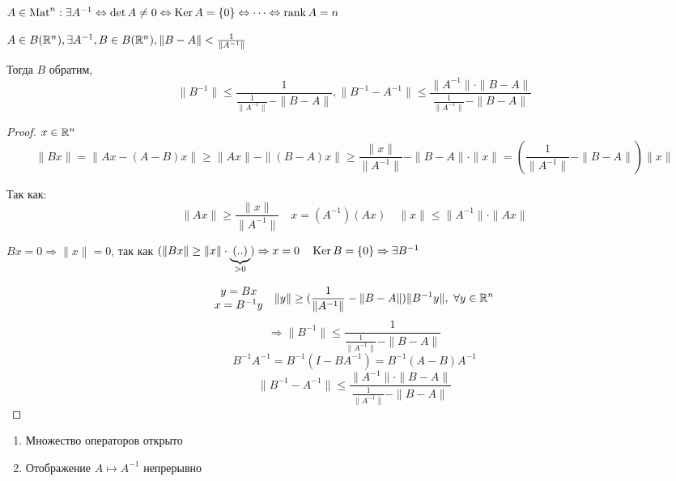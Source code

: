     $A \in \operatorname{Mat}^{n} : \exists A^{-1} \Leftrightarrow \det A \not= 0 \Leftrightarrow \operatorname{Ker} A = \{0\} \Leftrightarrow \dots \Leftrightarrow \operatorname{rank} A = n$

    \begin{theorem}
        $A \in B(\mathbb{R}^n), \exists A^{-1}, B \in B(\mathbb{R}^n), \| B - A \| < \frac{1}{\| A^{-1} \|}$
        \par Тогда $B$ обратим,
        \[
            \| B^{-1} \| \le \frac{1}{\frac{1}{\| A^{-1} \|}  - \| B - A \|}, \| B^{-1} - A^{-1} \| \le \frac{\| A^{-1} \| \cdot \| B - A \|}{\frac{1}{\| A^{-1} \|} - \| B - A \|}  
        \]
    \end{theorem}

    \begin{proof}
        $x \in \mathbb{R}^n$
        \[
            \| Bx \| = \| Ax - (A-B)x \| \ge \| Ax \| - \| (B-A)x \| \ge \frac{\| x \|}{\| A^{-1} \|} - \| B-A \| \cdot \| x \| = (\frac{1}{\|A^{-1}\|} - \|B-A\|) \|x\|
        \]
        \par Так как:
        \[
            \|Ax\| \ge \frac{\|x\|}{\|A^{-1}\|} \quad x = (A^{-1})(Ax) \quad \|x\| \le \|A^{-1}\| \cdot \|Ax\|  
        \]
        
            $Bx = 0 \Rightarrow \|x\| = 0$, так как  $(\|Bx\| \ge \|x\| \cdot \underbrace{(..)}_{>0}) \Rightarrow x = 0 \quad \operatorname{Ker} B = \{0\} \Rightarrow \exists B^{-1}$  
        
        \[
            \begin{matrix} y = Bx \\ x = B^{-1}y \end{matrix} \quad \|y\| \ge (\frac{1}{\|A^{-1}\|} - \|B-A\|)\|B^{-1}y\|, \ \forall y \in \mathbb{R}^n  
        \]
        \[
            \Rightarrow \|B^{-1}\| \le \frac{1}{\frac{1}{\|A^{-1}\|} - \|B-A\|}    
        \]
        \[
            B^{-1}A^{-1} = B^{-1}(I-BA^{-1}) = B^{-1}(A-B)A^{-1}
        \]
        \[
            \|B^{-1}-A^{-1}\| \le \frac{\|A^{-1}\| \cdot \|B-A\|}{\frac{1}{\|A^{-1}\|} - \|B-A\|}
        \]
    \end{proof}

    \begin{remark}\leavevmode
        \begin{enumerate}
            \item Множество операторов открыто
            \item Отображение $A \mapsto A^{-1}$ непрерывно
        \end{enumerate}
    \end{remark}
    

